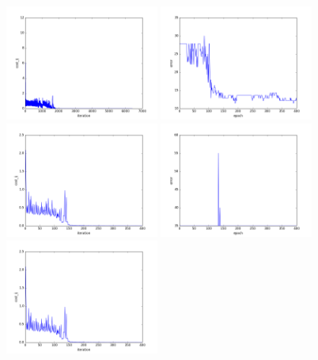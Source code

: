 \begin{figure}[htb]
\centering
\includegraphics[width=0.45\textwidth]{images/redes/ejecucion1/general_svm_casia_video/cost.png}
\includegraphics[width=0.45\textwidth]{images/redes/ejecucion1/general_svm_casia_video/error.png}
\includegraphics[width=0.45\textwidth]{images/redes/ejecucion1/general_svm_casia_video/minidataset/cost.png}
\includegraphics[width=0.45\textwidth]{images/redes/ejecucion1/general_svm_casia_video/minidataset/error.png}
\includegraphics[width=0.45\textwidth]{images/redes/ejecucion1/general_svm_casia_video/minidataset_tested_itself/cost.png}

\end{figure}
